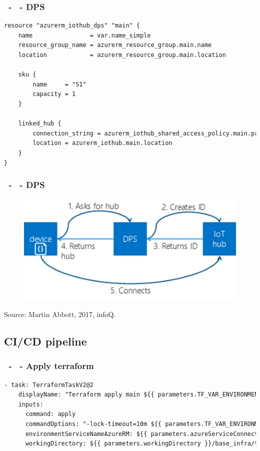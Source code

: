 \documentclass{beamer}
\begin{document}
\begin{frame}[fragile]
\frametitle{\secname\ - \subsecname\ - DPS}
    \begin{lstlisting}[language=HTML]
resource "azurerm_iothub_dps" "main" {
    name                = var.name_simple
    resource_group_name = azurerm_resource_group.main.name
    location            = azurerm_resource_group.main.location

    sku {
        name     = "S1"
        capacity = 1
    }

    linked_hub {
        connection_string = azurerm_iothub_shared_access_policy.main.primary_connection_string
        location = azurerm_iothub.main.location
    }
}
    \end{lstlisting}
\end{frame}

\begin{frame}
\frametitle{\secname\ - \subsecname\ - DPS}
\begin{figure}
    \includegraphics[width=0.5\linewidth]{Imagens/dps.png}
\end{figure}
Source: Martin Abbott, 2017, infoQ.
\end{frame}

\subsection{CI/CD pipeline}

\begin{frame}[fragile]
\frametitle{\secname\ - \subsecname\ - Apply terraform}
\begin{lstlisting}[language=HTML]
  - task: TerraformTaskV2@2
    displayName: "Terraform apply main ${{ parameters.TF_VAR_ENVIRONMENT }}"
    inputs:
      command: apply
      commandOptions: "-lock-timeout=10m ${{ parameters.TF_VAR_ENVIRONMENT }}-main.plan"
      environmentServiceNameAzureRM: ${{ parameters.azureServiceConnection }}
      workingDirectory: ${{ parameters.workingDirectory }}/base_infra/tf-main/
\end{lstlisting}
\end{frame}
\end{document}
